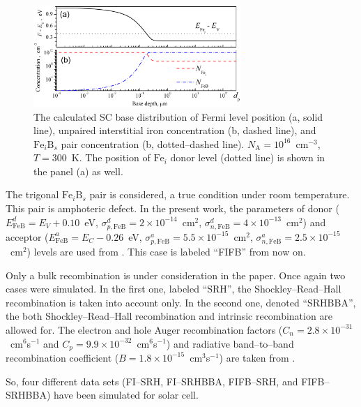 \documentclass [sort&compress] {elsarticle}
\begin{document}
\begin{figure}
\includegraphics[width=0.7\textwidth]{Fig2}%
\caption{\label{figDist}
The calculated SC base distribution of Fermi level position (a, solid line), unpaired interstitial iron concentration (b, dashed line),
and $\mathrm{Fe}_i\mathrm{B}_s$ pair concentration (b, dotted--dashed line).
$N_\mathrm{A}=10^{16}$~cm$^{-3}$, $T=300$~K.
The position of $\mathrm{Fe}_i$ donor level (dotted line) is shown in the panel (a) as well.
}%
\end{figure}


The trigonal $\mathrm{Fe}_i\mathrm{B}_s$ pair is considered, a true condition under room temperature.
This pair is amphoteric defect.
In the present work, the parameters of donor ($E_{\mathrm{FeB}}^{d} = E_V+0.10$~eV,
$\sigma_{p,\mathrm{FeB}}^d=2\times10^{-14}$~cm$^2$,
$\sigma_{n,\mathrm{FeB}}^d=4\times10^{-13}$~cm$^2$)
and  acceptor ($E_{\mathrm{FeB}}^{a} = E_C-0.26$~eV,
$\sigma_{p,\mathrm{FeB}}^a=5.5\times10^{-15}$~cm$^2$,
$\sigma_{n,\mathrm{FeB}}^a=2.5\times10^{-15}$~cm$^2$)
levels are used from \cite{Istratov1999,Rein2,MurphyJAP2011,FeB:kinetic}.
This case is labeled ``FIFB'' from now on.

Only a bulk recombination is under consideration in the paper.
Once again two cases were simulated.
In the first one, labeled ``SRH'', the Shockley--Read--Hall recombination is taken into account only.
In the second one, denoted ``SRHBBA'', the both Shockley--Read--Hall recombination and intrinsic recombination are allowed for.
The electron and hole Auger recombination factors ($C_n=2.8\times10^{-31}$~cm$^6$s$^{-1}$ and $C_p=9.9\times10^{-32}$~cm$^6$s$^{-1}$)
and radiative band--to--band recombination coefficient ($B=1.8\times10^{-15}$~cm$^3$s$^{-1}$)
are taken from \cite{Markvart}.

So, four different data sets (FI--SRH, FI--SRHBBA, FIFB--SRH, and FIFB--SRHBBA)
have been simulated for solar cell.
\end{document}
